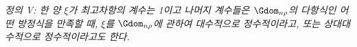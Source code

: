 
\emph{정의 V: 한 양 $\xi$가 최고차항의 계수는 1이고 나머지 계수들은 $\Gdom_{n\rho}$의 다항식인 어떤 방정식을 만족할 때, $\xi$를 $\Gdom_{n\rho}$에 관하여 대수적으로 정수적이라고, 또는 상대대수적으로 정수적이라고도 한다.}

